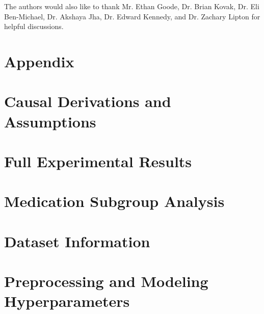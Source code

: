 \documentclass[pmlr,twocolumn,10pt]{jmlr} %
\begin{document}
The authors would also like to thank Mr. Ethan Goode, Dr. Brian Kovak, Dr. Eli Ben-Michael, Dr. Akshaya Jha, Dr. Edward Kennedy, and Dr. Zachary Lipton for helpful discussions.



\clearpage

\appendix
\section*{Appendix}
\label{apd:outline}


\clearpage
\section{Causal Derivations and Assumptions}
\label{apd:causal_derivations}

\newpage

\clearpage
\section{Full Experimental Results}
\label{apd:full_results}

\newpage

\clearpage
\section{Medication Subgroup Analysis}
\label{apd:medication_subgroup_analysis}

\newpage

\clearpage
\section{Dataset Information}
\label{apd:dataset_information}

\newpage

\clearpage
\section{Preprocessing and Modeling Hyperparameters}
\label{apd:preprocessing_and_modeling_hyperparameters}



% 
\end{document}
